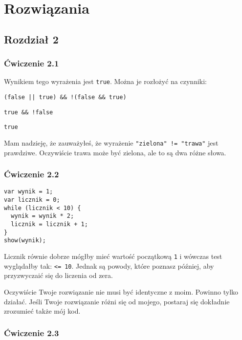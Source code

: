 \chapter{Rozwiązania}


\section*{Rozdział 2}
\label{sol:2}

\subsection*{Ćwiczenie 2.1}
\label{sol:2.1}

Wynikiem tego wyrażenia jest \texttt{true}. Można je rozłożyć na czynniki:

\begin{verbatim} 
(false || true) && !(false && true)
\end{verbatim}

\begin{verbatim} 
true && !false
\end{verbatim}

\begin{verbatim} 
true
\end{verbatim}
      
Mam nadzieję, że zauważyłeś, że wyrażenie \texttt{"zielona" != "trawa"} jest prawdziwe. Oczywiście trawa może być zielona, ale to są dwa różne słowa.

\subsection*{Ćwiczenie 2.2}
\label{sol:2.2}

\begin{verbatim} 
var wynik = 1;
var licznik = 0;
while (licznik < 10) {
  wynik = wynik * 2;
  licznik = licznik + 1;
}
show(wynik);
\end{verbatim}
      
Licznik równie dobrze mógłby mieć wartość początkową \texttt{1} i wówczas test wyglądałby tak: \texttt{<= 10}. Jednak są powody, które poznasz później, aby przyzwyczaić się do liczenia od zera.

      
Oczywiście Twoje rozwiązanie nie musi być identyczne z moim. Powinno tylko działać. Jeśli Twoje rozwiązanie różni się od mojego, postaraj się dokładnie zrozumieć także mój kod.

\subsection*{Ćwiczenie 2.3}
\label{sol:2.3}

